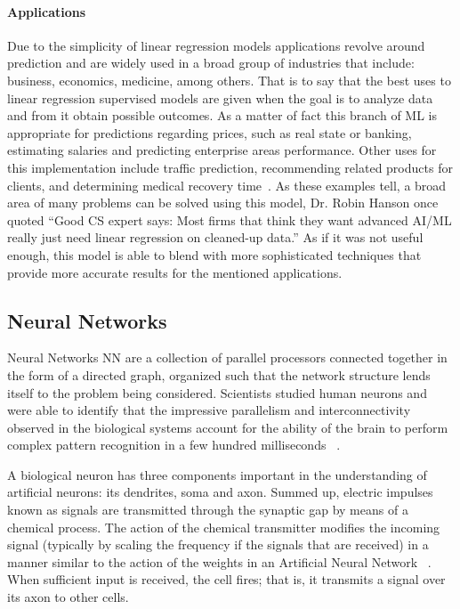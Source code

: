 \paragraph{Applications}

Due to the simplicity of linear regression models applications revolve around prediction and are widely used in a broad group of industries that include: business, economics, medicine, among others. That is to say that the best uses to linear regression supervised models are given when the goal is to analyze data and from it obtain possible outcomes. As a matter of fact this branch of \ac{ML} is appropriate for predictions regarding prices, such as real state or banking, estimating salaries and predicting enterprise areas performance. Other uses for this implementation include traffic prediction, recommending related products for clients, and determining medical recovery time~\cite{grandeur17}. As these examples tell, a broad area of many problems can be solved using this model, Dr. Robin Hanson once quoted “Good CS expert says: Most firms that think they want advanced AI/ML really just need linear regression on cleaned-up data.” As if it was not useful enough, this model is able to blend with more sophisticated techniques that provide more accurate results for the mentioned applications. 



\subsection{Neural Networks}

Neural Networks \ac{NN}  are a collection of parallel processors connected together in the form of a directed graph, organized such that the network structure lends itself to the problem being considered. Scientists studied human neurons and were able to identify that the impressive parallelism and interconnectivity observed in the biological systems account for the ability of the brain to perform complex pattern recognition in a few hundred milliseconds ~\cite{freeman91}.

A biological neuron has three components important in the understanding of artificial neurons: its dendrites, soma and axon. Summed up, electric impulses known as signals are transmitted through the synaptic gap by means of a chemical process. The action of the chemical transmitter modifies the incoming signal (typically by scaling the frequency if the signals that are received) in a manner similar to the action of the weights in an Artificial Neural Network ~\cite{fausett93}. When sufficient input is received, the cell fires; that is, it transmits a signal over its axon to other cells. 

